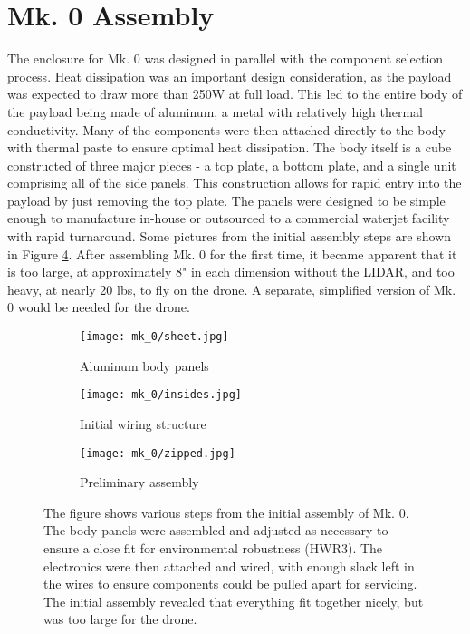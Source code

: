 \section{Mk. 0 Assembly}

The enclosure for Mk. 0 was designed in parallel with the component selection process. Heat dissipation was an important design consideration, as the payload was expected to draw more than 250W at full load. This led to the entire body of the payload being made of aluminum, a metal with relatively high thermal conductivity. Many of the components were then attached directly to the body with thermal paste to ensure optimal heat dissipation. The body itself is a cube constructed of three major pieces - a top plate, a bottom plate, and a single unit comprising all of the side panels. This construction allows for rapid entry into the payload by just removing the top plate. The panels were designed to be simple enough to manufacture in-house or outsourced to a commercial waterjet facility with rapid turnaround. Some pictures from the initial assembly steps are shown in Figure \ref{mk_0_assembly}. After assembling Mk. 0 for the first time, it became apparent that it is too large, at approximately 8" in each dimension without the LIDAR, and too heavy, at nearly 20 lbs, to fly on the drone. A separate, simplified version of Mk. 0 would be needed for the drone.

\begin{figure}
	\centering
	\begin{subfigure}{0.32\textwidth}
		\texttt{[image: mk\_0/sheet.jpg]}
		\caption{Aluminum body panels}
		\label{mk_0_sheet}
	\end{subfigure}		
	\hfill
	\begin{subfigure}{0.32\textwidth}
		\texttt{[image: mk\_0/insides.jpg]}
		\caption{Initial wiring structure}
		\label{mk_0_wiring}		
	\end{subfigure}
	\hfill
	\begin{subfigure}{0.32\textwidth}
		\texttt{[image: mk\_0/zipped.jpg]}
		\caption{Preliminary assembly}
		\label{mk_0_zipped}
	\end{subfigure}	
	\caption[Photos from Mk. 0 initial assembly]{The figure shows various steps from the initial assembly of Mk. 0. The body panels were assembled and adjusted as necessary to ensure a close fit for environmental robustness (HWR3). The electronics were then attached and wired, with enough slack left in the wires to ensure components could be pulled apart for servicing. The initial assembly revealed that everything fit together nicely, but was too large for the drone.}
	\label{mk_0_assembly}
\end{figure}

